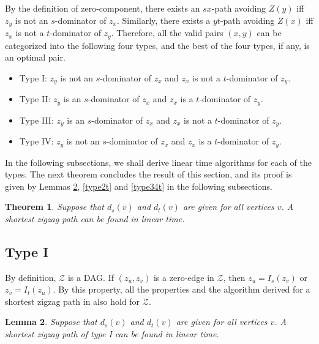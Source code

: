 \documentclass[review]{elsarticle}
\def\squarebox#1{\hbox to #1{\hfill\vbox to #1{\vfill}}}
\renewcommand{\qed}{\hspace*{\fill}
            \vbox{\hrule\hbox{\vrule\squarebox{.667em}\vrule}\hrule}\smallskip\newline}
\newtheorem{thm}{Theorem}
\newtheorem{lem}[thm]{Lemma}
\begin{document}
By the definition of zero-component, there exists an $sx$-path
avoiding $Z(y)$ iff $z_y$ is not an $s$-dominator of $z_x$.
Similarly, there exists a $yt$-path avoiding $Z(x)$ iff $z_x$ is not
a $t$-dominator of $z_y$. Therefore, all the valid pairs $(x,y)$ can
be categorized into the following four types, and the best of the
four types, if any, is an optimal pair.
\begin{itemize}
\item Type I: $z_y$ is not an $s$-dominator of $z_x$ and $z_x$ is not a $t$-dominator of $z_y$.
\item Type II: $z_y$ is an $s$-dominator of $z_x$ and $z_x$ is a $t$-dominator of $z_y$.
\item Type III: $z_y$ is an $s$-dominator of $z_x$ and $z_x$ is not a $t$-dominator of $z_y$.
\item Type IV: $z_y$ is not an $s$-dominator of $z_x$ and $z_x$ is a $t$-dominator of $z_y$.
\end{itemize}

In the following subsections, we shall derive linear time algorithms
for each of the types. The next theorem concludes the result of this
section, and its proof is given by Lemmas \ref{type1t}, \ref{type2t}
and \ref{type34t} in the following subsections.


\begin{thm}\label{thm:back}
Suppose that $d_s(v)$ and $d_t(v)$ are given for all vertices $v$. A
shortest zigzag path can be found in linear time.
\end{thm}


\subsection{Type I}

By definition, $\mathcal{Z}$ is a DAG. If $(z_u,z_v)$ is a zero-edge
in $\mathcal{Z}$, then  $z_u=I_s(z_v)$ or $z_v=I_t(z_u)$. By this
property, all the properties and the algorithm derived for a
shortest zigzag path in \cite{wu10} also hold for $\mathcal{Z}$.
\begin{lem}\label{type1t}
Suppose that $d_s(v)$ and $d_t(v)$ are given for all vertices $v$. A
shortest zigzag path of type I can be found in linear time.
\end{lem}
\end{document}
